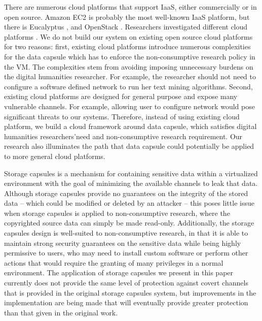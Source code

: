 \documentclass{acm_proc_article-sp}
\begin{document}
There are numerous cloud platforms that support IaaS, either commercially or in open source. Amazon EC2 \cite{EC2} is probably the most well-known IaaS platform, but there is Eucalyptus \cite{Nurmi:2009:EOC:1577849.1577895}, and OpenStack \cite{OpenStack}. Researchers investigated different cloud platforms \cite{Sempolinski:cloud,vonLaszewski:2012:CMC:2353730.2353779}. We do not build our system on existing open source cloud platforms for two reasons: first, existing cloud platforms introduce numerous complexities for the data capsule which has to enforce the non-consumptive research policy in the VM. The complexities stem from avoiding imposing unnecessary burdens on the digital humanities researcher. For example, the researcher should not need to configure a software defined network to run her text mining algorithms. Second, existing cloud platforms are designed for general purpose and expose many vulnerable channels. For example, allowing user to configure network would pose significant threats to our systems. Therefore, instead of using existing cloud platform, we build a cloud framework around data capsule, which satisfies digital humanities researchers\rq need and non-consumptive research requirement. Our research also illuminates the path that data capsule could potentially be applied to more general cloud platforms.

Storage capsules \cite{Borders:2009:PCD:1855768.1855791} is a mechanism for
containing sensitive data within a virtualized environment with the goal of
minimizing the available channels to leak that data.  Although storage capsules
provide no guarantees on the integrity of the stored data -- which could be
modified or deleted by an attacker -- this poses little issue when storage
capsules is applied to non-consumptive research, where the copyrighted source
data can simply be made read-only.  Additionally, the storage capsules design
is well-suited to non-consumptive research, in that it is able to maintain
strong security guarantees on the sensitive data while being highly permissive
to users, who may need to install custom software or perform other actions that
would require the granting of many privileges in a normal environment.  The
application of storage capsules we present in this paper currently does not
provide the same level of protection against covert channels that is provided
in the original storage capsules system, but improvements in the implementation
are being made that will eventually provide greater protection than that given
in the original work.
\end{document}
